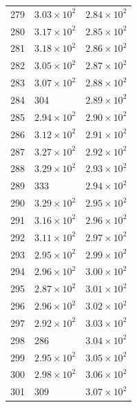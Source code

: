 \begin{table}[H]
\begin{tabular}{lll}
279 & $\displaystyle 3.03 \times 10^{2}$ & $\displaystyle 2.84 \times 10^{2}$ \\
280 & $\displaystyle 3.17 \times 10^{2}$ & $\displaystyle 2.85 \times 10^{2}$ \\
281 & $\displaystyle 3.18 \times 10^{2}$ & $\displaystyle 2.86 \times 10^{2}$ \\
282 & $\displaystyle 3.05 \times 10^{2}$ & $\displaystyle 2.87 \times 10^{2}$ \\
283 & $\displaystyle 3.07 \times 10^{2}$ & $\displaystyle 2.88 \times 10^{2}$ \\
284 & 304 & $\displaystyle 2.89 \times 10^{2}$ \\
285 & $\displaystyle 2.94 \times 10^{2}$ & $\displaystyle 2.90 \times 10^{2}$ \\
286 & $\displaystyle 3.12 \times 10^{2}$ & $\displaystyle 2.91 \times 10^{2}$ \\
287 & $\displaystyle 3.27 \times 10^{2}$ & $\displaystyle 2.92 \times 10^{2}$ \\
288 & $\displaystyle 3.29 \times 10^{2}$ & $\displaystyle 2.93 \times 10^{2}$ \\
289 & 333 & $\displaystyle 2.94 \times 10^{2}$ \\
290 & $\displaystyle 3.29 \times 10^{2}$ & $\displaystyle 2.95 \times 10^{2}$ \\
291 & $\displaystyle 3.16 \times 10^{2}$ & $\displaystyle 2.96 \times 10^{2}$ \\
292 & $\displaystyle 3.11 \times 10^{2}$ & $\displaystyle 2.97 \times 10^{2}$ \\
293 & $\displaystyle 2.95 \times 10^{2}$ & $\displaystyle 2.99 \times 10^{2}$ \\
294 & $\displaystyle 2.96 \times 10^{2}$ & $\displaystyle 3.00 \times 10^{2}$ \\
295 & $\displaystyle 2.87 \times 10^{2}$ & $\displaystyle 3.01 \times 10^{2}$ \\
296 & $\displaystyle 2.96 \times 10^{2}$ & $\displaystyle 3.02 \times 10^{2}$ \\
297 & $\displaystyle 2.92 \times 10^{2}$ & $\displaystyle 3.03 \times 10^{2}$ \\
298 & 286 & $\displaystyle 3.04 \times 10^{2}$ \\
299 & $\displaystyle 2.95 \times 10^{2}$ & $\displaystyle 3.05 \times 10^{2}$ \\
300 & $\displaystyle 2.98 \times 10^{2}$ & $\displaystyle 3.06 \times 10^{2}$ \\
301 & 309 & $\displaystyle 3.07 \times 10^{2}$ \\

\end{tabular}
\end{table}
